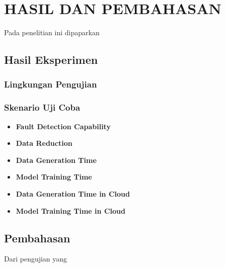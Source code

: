 \chapter{HASIL DAN PEMBAHASAN}
\label{chap:hasildanpembahasan}

Pada penelitian ini dipaparkan \lipsum[1][1-5]

\section{Hasil Eksperimen}
\label{sec:hasilpengujian}

\subsection{Lingkungan Pengujian}
\label{subsec:lingkunganpengujian}

\lipsum[1]

\subsection{Skenario Uji Coba}
\label{subsec:skenarioujicoba}

\lipsum[2]

\begin{itemize}
  \item \textbf{Fault Detection Capability} \\
        \lipsum[3]
  \item \textbf{Data Reduction} \\
        \lipsum[4]
  \item \textbf{Data Generation Time} \\
        \lipsum[5]
  \item \textbf{Model Training Time} \\
        \lipsum[6]
  \item \textbf{Data Generation Time in Cloud} \\
        \lipsum[7]
  \item \textbf{Model Training Time in Cloud} \\
        \lipsum[8]
\end{itemize}

\section{Pembahasan}
\label{sec:pembahasan}

Dari pengujian yang \lipsum[1]

